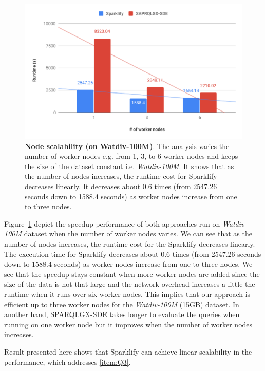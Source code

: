 \begin{figure}
  \includegraphics[width=1.0\columnwidth]{images/6_scalable_rdf_querying/sparklify-node-scalability.pdf}
    \caption{\textbf{Node scalability (on Watdiv-100M)}.
    The analysis varies the number of worker nodes e.g. from 1, 3, to 6 worker nodes and keeps the size of the dataset constant i.e. \textit{Watdiv-100M}.
    It shows that as the number of nodes increases, the runtime cost for Sparklify decreases linearly.
    It decreases about 0.6 times (from 2547.26 seconds down to 1588.4 seconds) as worker nodes increase from one to three nodes.}
    \label{fig:sparklify-node-scalability}
\end{figure}

Figure~\ref{fig:sparklify-node-scalability} depict the speedup performance of both approaches run on \textit{Watdiv-100M} dataset when the number of worker nodes varies.
We can see that as the number of nodes increases, the runtime cost for the Sparklify decreases linearly.
The execution time for Sparklify decreases about 0.6 times (from 2547.26 seconds down to 1588.4 seconds) as worker nodes increase from one to three nodes.
We see that the speedup stays constant when more worker nodes are added since the size of the data is not that large and the network overhead increases a little the runtime when it runs over six worker nodes.
This implies that our approach is efficient up to three worker nodes for the \textit{Watdiv-100M} (15GB) dataset.
In another hand, SPARQLGX-SDE takes longer to evaluate the queries when running on one worker node but it improves when the number of worker nodes increases.

Result presented here shows that Sparklify can achieve linear scalability in the performance, which addresses \ref{item:Q3}.

